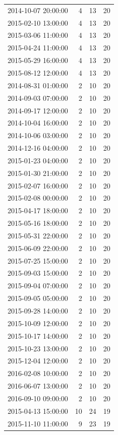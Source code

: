 \begin{tabular}{lrrr}
2014-10-07 20:00:00 & 4 & 13 & 20 \\
2015-02-10 13:00:00 & 4 & 13 & 20 \\
2015-03-06 11:00:00 & 4 & 13 & 20 \\
2015-04-24 11:00:00 & 4 & 13 & 20 \\
2015-05-29 16:00:00 & 4 & 13 & 20 \\
2015-08-12 12:00:00 & 4 & 13 & 20 \\
2014-08-31 01:00:00 & 2 & 10 & 20 \\
2014-09-03 07:00:00 & 2 & 10 & 20 \\
2014-09-17 12:00:00 & 2 & 10 & 20 \\
2014-10-04 16:00:00 & 2 & 10 & 20 \\
2014-10-06 03:00:00 & 2 & 10 & 20 \\
2014-12-16 04:00:00 & 2 & 10 & 20 \\
2015-01-23 04:00:00 & 2 & 10 & 20 \\
2015-01-30 21:00:00 & 2 & 10 & 20 \\
2015-02-07 16:00:00 & 2 & 10 & 20 \\
2015-02-08 00:00:00 & 2 & 10 & 20 \\
2015-04-17 18:00:00 & 2 & 10 & 20 \\
2015-05-16 18:00:00 & 2 & 10 & 20 \\
2015-05-31 22:00:00 & 2 & 10 & 20 \\
2015-06-09 22:00:00 & 2 & 10 & 20 \\
2015-07-25 15:00:00 & 2 & 10 & 20 \\
2015-09-03 15:00:00 & 2 & 10 & 20 \\
2015-09-04 07:00:00 & 2 & 10 & 20 \\
2015-09-05 05:00:00 & 2 & 10 & 20 \\
2015-09-28 14:00:00 & 2 & 10 & 20 \\
2015-10-09 12:00:00 & 2 & 10 & 20 \\
2015-10-17 14:00:00 & 2 & 10 & 20 \\
2015-10-23 13:00:00 & 2 & 10 & 20 \\
2015-12-04 12:00:00 & 2 & 10 & 20 \\
2016-02-08 10:00:00 & 2 & 10 & 20 \\
2016-06-07 13:00:00 & 2 & 10 & 20 \\
2016-09-10 09:00:00 & 2 & 10 & 20 \\
2015-04-13 15:00:00 & 10 & 24 & 19 \\
2015-11-10 11:00:00 & 9 & 23 & 19 \\

\end{tabular}
